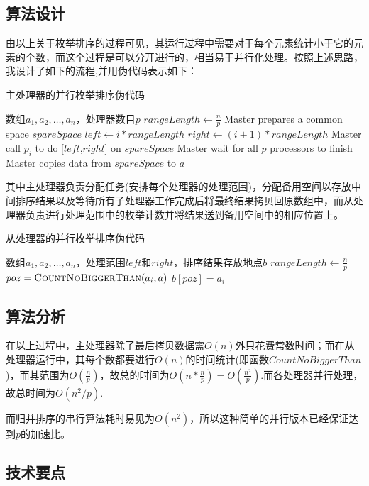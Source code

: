 \documentclass[UTF8]{article}
\begin{document}
\subsection{算法设计}
由以上关于枚举排序的过程可见，其运行过程中需要对于每个元素统计小于它的元素的个数，而这个过程是可以分开进行的，相当易于并行化处理。按照上述思路，我设计了如下的流程,并用伪代码表示如下：
\begin{algorithm}
\caption{主处理器的并行枚举排序伪代码}	
\begin{algorithmic}[1]
\Require 数组$a_1,a_2,\ldots,a_n$，处理器数目$p$  
\State $rangeLength \gets \frac{n}{p}$  
\State Master prepares a common space $spareSpace$
\State $left \gets i*rangeLength$
\State $right \gets (i+1)*rangeLength$
\State Master call $p_i$ to do [$left$,$right$] on $spareSpace$
\EndFor
\State Master wait for all $p$ processors to finish
\State Master copies data from $spareSpace$ to $a$
\State {}  
\EndFunction 	
\end{algorithmic}
\end{algorithm}
其中主处理器负责分配任务(安排每个处理器的处理范围)，分配备用空间以存放中间排序结果以及等待所有子处理器工作完成后将最终结果拷贝回原数组中，而从处理器负责进行处理范围中的枚举计数并将结果送到备用空间中的相应位置上。
\begin{algorithm}
\caption{从处理器的并行枚举排序伪代码}	
\begin{algorithmic}[1]
\Require 数组$a_1,a_2,\ldots,a_n$，处理范围$left$和$right$，排序结果存放地点$b$  
\State $rangeLength \gets \frac{n}{p}$  
\State $poz=\Call {CountNoBiggerThan}{a_i,a}$
\State $b[poz]=a_i$
\EndFor
\EndFunction
\end{algorithmic}
\end{algorithm}
\subsection{算法分析}
在以上过程中，主处理器除了最后拷贝数据需$O(n)$外只花费常数时间；而在从处理器运行中，其每个数都要进行$O(n)$的时间统计(即函数$CountNoBiggerThan$)，而其范围为$O(\frac{n}{p})$，故总的时间为$O(n*\frac{n}{p})=O(\frac{n^2}{p})$.而各处理器并行处理，故总时间为$O(n^2/p)$.
\par 而归并排序的串行算法耗时易见为$O(n^2)$，所以这种简单的并行版本已经保证达到$p$的加速比。
\subsection{技术要点}
\end{document}

